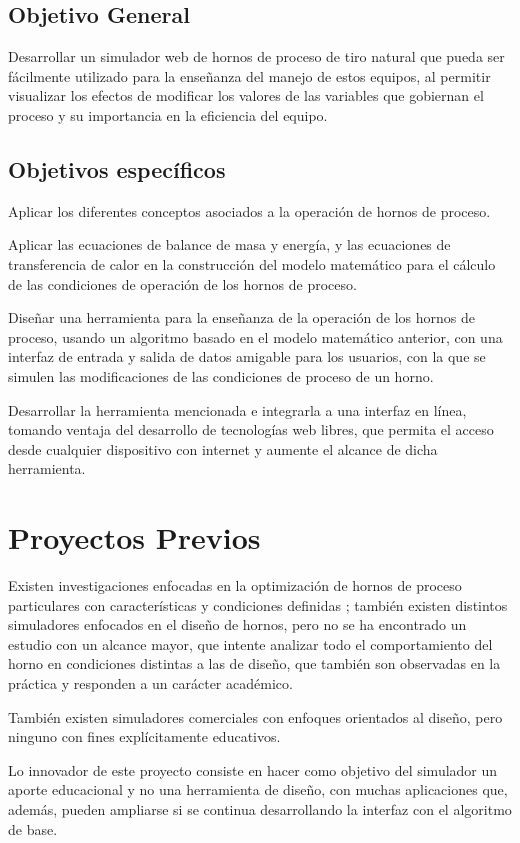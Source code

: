 \subsection{Objetivo General}

\par Desarrollar un simulador web de hornos de proceso de tiro natural que pueda ser fácilmente utilizado para la enseñanza del manejo de estos equipos, al permitir visualizar los efectos de modificar los valores de las variables que gobiernan el proceso y su importancia en la eficiencia del equipo.

\subsection{Objetivos específicos}

\par Aplicar los diferentes conceptos asociados a la operación de hornos de proceso.

\par Aplicar las ecuaciones de balance de masa y energía, y las ecuaciones de transferencia de calor en la construcción del modelo matemático para el cálculo de las condiciones de operación de los hornos de proceso.

\par Diseñar una herramienta para la enseñanza de la operación de los hornos de proceso, usando un algoritmo basado en el modelo matemático anterior, con una interfaz de entrada y salida de datos amigable para los usuarios, con la que se simulen las modificaciones de las condiciones de proceso de un horno.

\par Desarrollar la herramienta mencionada e integrarla a una interfaz en línea, tomando ventaja del desarrollo de tecnologías web libres, que permita el acceso desde cualquier dispositivo con internet y aumente el alcance de dicha herramienta.

\section{Proyectos Previos}

\par Existen investigaciones enfocadas en la optimización de hornos de proceso particulares con características y condiciones definidas \cite{bib:leti}; también existen distintos simuladores enfocados en el diseño de hornos, pero no se ha encontrado un estudio con un alcance mayor, que intente analizar todo el comportamiento del horno en condiciones distintas a las de diseño, que también son observadas en la práctica y responden a un carácter académico.

\par También existen simuladores comerciales con enfoques orientados al diseño, pero ninguno con fines explícitamente educativos.

\par Lo innovador de este proyecto consiste en hacer como objetivo del simulador un aporte educacional y no una herramienta de diseño, con muchas aplicaciones que, además, pueden ampliarse si se continua desarrollando la interfaz con el algoritmo de base.